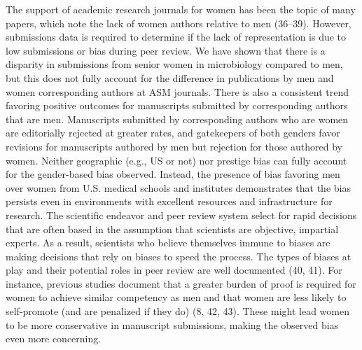 \documentclass[11pt,]{article}
\begin{document}
The support of academic research journals for women has been the topic
of many papers, which note the lack of women authors relative to men
(36--39). However, submissions data is required to determine if the lack
of representation is due to low submissions or bias during peer review.
We have shown that there is a disparity in submissions from senior women
in microbiology compared to men, but this does not fully account for the
difference in publications by men and women corresponding authors at ASM
journals. There is also a consistent trend favoring positive outcomes
for manuscripts submitted by corresponding authors that are men.
Manuscripts submitted by corresponding authors who are women are
editorially rejected at greater rates, and gatekeepers of both genders
favor revisions for manuscripts authored by men but rejection for those
authored by women. Neither geographic (e.g., US or not) nor prestige
bias can fully account for the gender-based bias observed. Instead, the
presence of bias favoring men over women from U.S. medical schools and
institutes demonstrates that the bias persists even in environments with
excellent resources and infrastructure for research. The scientific
endeavor and peer review system select for rapid decisions that are
often based in the assumption that scientists are objective, impartial
experts. As a result, scientists who believe themselves immune to biases
are making decisions that rely on biases to speed the process. The types
of biases at play and their potential roles in peer review are well
documented (40, 41). For instance, previous studies document that a
greater burden of proof is required for women to achieve similar
competency as men and that women are less likely to self-promote (and
are penalized if they do) (8, 42, 43). These might lead women to be more
conservative in manuscript submissions, making the observed bias even
more concerning.
\end{document}
